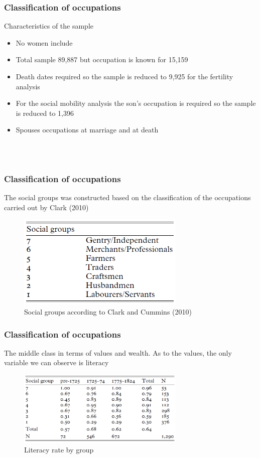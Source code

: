 \documentclass[pdftex,12pt,xcolor=pdftex,table]{beamer}
\begin{document}
\begin{frame}
\frametitle{Classification of occupations }
Characteristics of the sample
\begin{itemize}
    \item No women include 
    \item Total sample 89,887 but occupation is known for 15,159
    \item Death dates required so the sample is reduced to 9,925 for the fertility analysis 
    \item For the social mobility analysis the son's occupation is required so the sample is reduced to 1,396
    \item Spouses occupations at marriage and at death
  \end{itemize}\\~\\

\end{frame}
\begin{frame}
\frametitle{Classification of occupations}
The social groups was constructed based on the classification of the occupations carried out by Clark (2010) 
\begin{figure}[H]
    \raggedright
    \centering
    \includegraphics[width=8cm]{table2.PNG}
    \caption{Social groups according to Clark and Cummins (2010)}
 \end{figure}

\end{frame}
\begin{frame}
\frametitle{Classification of occupations}
The middle class in terms of values and wealth. As to the values, the only variable we can observe is literacy 
\begin{figure}[h!]
    \centering
    \includegraphics[width=8cm]{table3.PNG}
    \caption{Literacy rate by group}
 \end{figure}

\end{frame}
\end{document}
